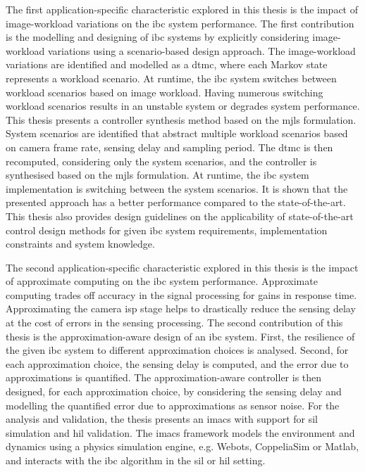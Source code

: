 The first application-specific characteristic explored in this thesis is the impact of image-workload variations on the \gls{ibc} system performance. The first contribution is the modelling and designing of \gls{ibc} systems by explicitly considering image-workload variations using a scenario-based design approach. The image-workload variations are identified and modelled as a \gls{dtmc}, where each Markov state represents a workload scenario. At runtime, the \gls{ibc} system switches between workload scenarios based on image workload. Having numerous switching workload scenarios results in an unstable system or degrades system performance. This thesis presents a controller synthesis method based on the \gls{mjls} formulation. System scenarios are identified that abstract multiple workload scenarios based on camera frame rate, sensing delay and sampling period. The \gls{dtmc} is then recomputed, considering only the system scenarios, and the controller is synthesised based on the \gls{mjls} formulation. At runtime, the \gls{ibc} system implementation is switching between the system scenarios. It is shown that the presented approach has a better performance compared to the state-of-the-art. This thesis also provides design guidelines on the applicability of state-of-the-art control design methods for given \gls{ibc} system requirements, implementation constraints and system knowledge.

The second application-specific characteristic explored in this thesis is the impact of approximate computing on the \gls{ibc} system performance. Approximate computing trades off accuracy in the signal processing for gains in response time. Approximating the camera \gls{isp} stage helps to drastically reduce the sensing delay at the cost of errors in the sensing processing. The second contribution of this thesis is the approximation-aware design of an \gls{ibc} system. First, the resilience of the given \gls{ibc} system to different approximation choices is analysed. Second, for each approximation choice, the sensing delay is computed, and the error due to approximations is quantified. The approximation-aware controller is then designed, for each approximation choice, by considering the sensing delay and modelling the quantified error due to approximations as sensor noise.  For the analysis and validation, the thesis presents an \gls{imacs} with support for \gls{sil} simulation and \gls{hil} validation. The \gls{imacs} framework models the environment and dynamics using a physics simulation engine, e.g. Webots, CoppeliaSim or Matlab, and interacts with the \gls{ibc} algorithm in the \gls{sil} or \gls{hil} setting. 

